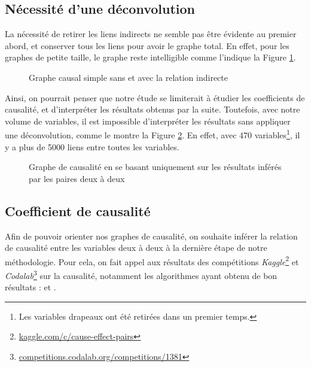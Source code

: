 \documentclass[11pt,fleqn,a4paper,openany,frenchb]{book} %
\begin{document}

\subsection{Nécessité d'une déconvolution}
La nécessité de retirer les liens indirects ne semble pas être évidente au premier abord, et conserver tous les liens pour avoir le graphe total. En effet, pour les graphes de petite taille, le graphe reste intelligible comme l'indique la Figure \ref{fig:graph-in-direct}. \par

\begin{figure}[!h]
  \centering
  \hspace{2pt}
  \caption{Graphe causal simple sans et avec la relation indirecte}
  \label{fig:graph-in-direct}
\end{figure}

Ainsi, on pourrait penser que notre étude se limiterait à étudier les coefficients de causalité, et d'interpréter les résultats obtenus par la suite. Toutefois, avec notre volume de variables, il est impossible d'interpréter les résultats sans appliquer une déconvolution, comme le montre la Figure \ref{fig:graph-ind-lp}. En effet, avec 470 variables\footnote{Les variables drapeaux ont été retirées dans un premier temps.}, il y a plus de 5000 liens entre toutes les variables.

\begin{figure}[!h]
\centering
\caption{Graphe de causalité en se basant uniquement sur les résultats inférés par les paires deux à deux}
\label{fig:graph-ind-lp}

\end{figure}

\subsection{Coefficient de causalité}
Afin de pouvoir orienter nos graphes de causalité, on souhaite inférer la relation de causalité entre les variables deux à deux à la dernière étape de notre méthodologie. Pour cela, on fait appel aux résultats des compétitions \textit{Kaggle}\footnote{\href{https://www.kaggle.com/c/cause-effect-pairs}{kaggle.com/c/cause-effect-pairs}} et \textit{Codalab}\footnote{\href{https://competitions.codalab.org/competitions/1381}{competitions.codalab.org/competitions/1381}} sur la causalité, notamment les algorithmes ayant obtenu de bon résultats : \cite{follonosa2016causalityvar} et \cite{lopez-paz2015learningcausality}.
\end{document}

